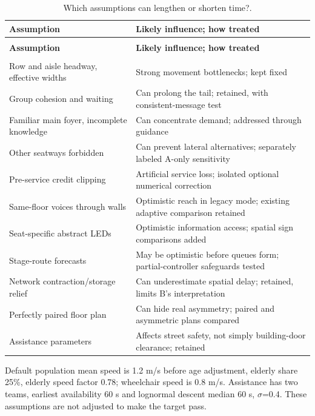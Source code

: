 \documentclass[11pt,a4paper]{article}
\begin{document}
\begingroup\small
\begin{longtable}{@{}>{\raggedright\arraybackslash}p{}>{\raggedright\arraybackslash}p{}@{}}
\caption{Which assumptions can lengthen or shorten time?.}\label{tab:5}\\
\toprule
\textbf{Assumption} & \textbf{Likely influence; how treated} \\
\midrule\endfirsthead
\multicolumn{2}{l}{\small\itshape Table \thetable{} continued}\\\toprule
\textbf{Assumption} & \textbf{Likely influence; how treated} \\
\midrule\endhead
\midrule\multicolumn{2}{r}{\small Continued on next page}\\\endfoot
\bottomrule\endlastfoot
Row and aisle headway, effective widths & Strong movement bottlenecks; kept fixed \\
Group cohesion and waiting & Can prolong the tail; retained, with consistent-message test \\
Familiar main foyer, incomplete knowledge & Can concentrate demand; addressed through guidance \\
Other seatways forbidden & Can prevent lateral alternatives; separately labeled A-only sensitivity \\
Pre-service credit clipping & Artificial service loss; isolated optional numerical correction \\
Same-floor voices through walls & Optimistic reach in legacy mode; existing adaptive comparison retained \\
Seat-specific abstract LEDs & Optimistic information access; spatial sign comparisons added \\
Stage-route forecasts & May be optimistic before queues form; partial-controller safeguards tested \\
Network contraction/storage relief & Can underestimate spatial delay; retained, limits B's interpretation \\
Perfectly paired floor plan & Can hide real asymmetry; paired and asymmetric plans compared \\
Assistance parameters & Affects street safety, not simply building-door clearance; retained \\
\end{longtable}\endgroup

Default population mean speed is 1.2 m/s before age adjustment, elderly share 25\%, elderly speed factor 0.78; wheelchair speed is 0.8 m/s. Assistance has two teams, earliest availability 60 s and lognormal descent median 60 s, \ensuremath{\sigma}=0.4. These assumptions are not adjusted to make the target pass.
\end{document}
